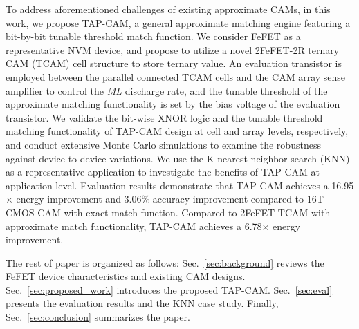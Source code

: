 To address aforementioned challenges of existing approximate CAMs, in this work, we propose TAP-CAM, a general approximate matching engine featuring a bit-by-bit tunable threshold match function. 
We consider FeFET as a representative NVM device, and propose to utilize a novel 2FeFET-2R ternary CAM (TCAM) cell structure to store ternary value. 
An evaluation transistor is employed between the parallel connected TCAM cells and the CAM array sense amplifier to control the \textit{ML} discharge rate, and the tunable threshold of the approximate matching functionality is set by the bias voltage of the evaluation transistor. 
We validate the bit-wise XNOR logic and the tunable  threshold matching functionality of  TAP-CAM design at cell and array levels,  respectively,  and conduct extensive Monte Carlo simulations to examine the robustness against device-to-device variations.
We use the K-nearest neighbor search (KNN) as a representative application to investigate the benefits of TAP-CAM at application level.
Evaluation results demonstrate that TAP-CAM achieves a 16.95$\times$ energy improvement and 3.06\% accuracy improvement compared to 16T CMOS CAM with exact match function. Compared to 2FeFET TCAM with
approximate match functionality, TAP-CAM achieves a 6.78$\times$
energy improvement.



The rest of paper is organized as follows: Sec.~\ref{sec:background} reviews the FeFET device characteristics and existing CAM designs. Sec.~\ref{sec:proposed_work} introduces the proposed TAP-CAM. Sec.~\ref{sec:eval} presents the evaluation results and the KNN case study. Finally, Sec.~\ref{sec:conclusion} summarizes the paper.



